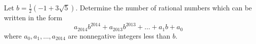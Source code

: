 Let $b = \frac 12 (-1 + 3\sqrt{5})$.  Determine the number of rational numbers which can be written in the form \[ a_{2014}b^{2014} + a_{2013}b^{2013} + \dots + a_1b + a_0 \] where $a_0, a_1, \dots, a_{2014}$ are nonnegative integers less than $b$.
